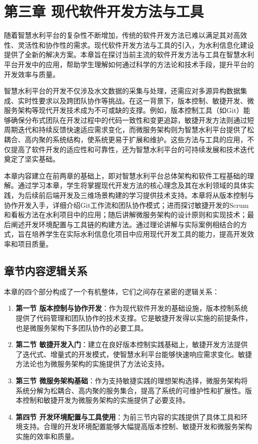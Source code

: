 \section{第三章
现代软件开发方法与工具}\label{ux7b2cux4e09ux7ae0-ux73b0ux4ee3ux8f6fux4ef6ux5f00ux53d1ux65b9ux6cd5ux4e0eux5de5ux5177}

随着智慧水利平台的复杂性不断增加，传统的软件开发方法已难以满足其对高效性、灵活性和协作性的需求。现代软件开发方法与工具的引入，为水利信息化建设提供了全新的解决方案。本章旨在探讨当前主流的软件开发方法与工具在智慧水利平台开发中的应用，帮助学生理解如何通过科学的方法论和技术手段，提升平台的开发效率与质量。

智慧水利平台的开发不仅涉及水文数据的采集与处理，还需应对多源异构数据集成、实时性要求以及跨团队协作等挑战。在这一背景下，版本控制、敏捷开发、微服务架构等现代开发技术成为不可或缺的支撑。例如，版本控制工具（如Git）能够确保分布式团队在开发过程中的代码一致性和变更追踪，敏捷开发方法则通过短周期迭代和持续反馈快速适应需求变化，而微服务架构则为智慧水利平台提供了松耦合、高内聚的系统结构，使系统更易于扩展和维护。这些方法与工具的应用，不仅提高了软件开发的适应性和可靠性，还为智慧水利平台的可持续发展和技术迭代奠定了坚实基础。

本章内容建立在前两章的基础上，即对智慧水利平台总体架构和软件工程基础的理解。通过学习本章，学生将掌握现代开发方法的核心理念及其在水利领域的具体实践，为后续前后端开发及三维场景构建的学习提供技术支持。本章将从版本控制与协作开发入手，详细介绍Git工作流和团队协作模式；进而探讨敏捷开发的Scrum和看板方法在水利项目中的应用；随后讲解微服务架构的设计原则和实现技术；最后阐述开发环境配置与工具链的构建方法。通过理论讲解与实际案例相结合的方式，旨在培养学生在实际水利信息化项目中应用现代开发工具的能力，提高开发效率和项目质量。

\subsection{章节内容逻辑关系}\label{ux7ae0ux8282ux5185ux5bb9ux903bux8f91ux5173ux7cfb}

本章的四个部分构成了一个有机整体，它们之间存在紧密的逻辑关系：

\begin{enumerate}
\def\labelenumi{\arabic{enumi}.}
\item
  \textbf{第一节
  版本控制与协作开发}：作为现代软件开发的基础设施，版本控制系统提供了代码管理和团队协作的技术支撑。它是敏捷开发得以实施的前提条件，也是微服务架构下多团队协作的必要工具。
\item
  \textbf{第二节
  敏捷开发入门}：建立在良好版本控制实践基础上，敏捷开发方法提供了迭代式、增量式的开发模式，使智慧水利平台能够快速响应需求变化。敏捷方法论也为微服务架构的实施提供了方法论支持。
\item
  \textbf{第三节
  微服务架构基础}：作为支持敏捷实践的理想架构选择，微服务架构将系统分解为松耦合、高内聚的服务集合，提高了系统的可维护性和扩展性。版本控制和敏捷开发为微服务架构的实施提供了必要支持。
\item
  \textbf{第四节
  开发环境配置与工具使用}：为前三节内容的实践提供了具体工具和环境支持。合理的开发环境配置能够大幅提高版本控制、敏捷开发和微服务架构实施的效率和质量。
\end{enumerate}

